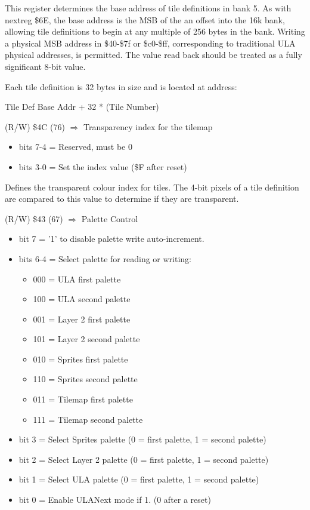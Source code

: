 This register determines the base address of tile definitions in bank
5.  As with nextreg \$6E, the base address is the MSB of the an offset
into the 16k bank, allowing tile definitions to begin at any multiple
of 256 bytes in the bank.  Writing a physical MSB address in \$40-\$7f
or \$c0-\$ff, corresponding to traditional ULA physical addresses, is
permitted.  The value read back should be treated as a fully
significant 8-bit value.

Each tile definition is 32 bytes in size and is located at address:

  Tile Def Base Addr + 32 * (Tile Number)

(R/W) \$4C (76) $\Rightarrow$ Transparency index for the tilemap
\begin{itemize}
\item bits 7-4 = Reserved, must be 0
\item bits 3-0 = Set the index value (\$F after reset)
\end{itemize}

Defines the transparent colour index for tiles.  The 4-bit pixels of a tile definition are compared to this value to determine if they are transparent.

(R/W) \$43 (67) $\Rightarrow$ Palette Control
\begin{itemize}
\item bit 7 = '1' to disable palette write auto-increment.
\item bits 6-4 = Select palette for reading or writing:
  \begin{itemize}
  \item 000 = ULA first palette
  \item 100 = ULA second palette
  \item 001 = Layer 2 first palette
  \item 101 = Layer 2 second palette
  \item 010 = Sprites first palette 
  \item 110 = Sprites second palette
  \item 011 = Tilemap first palette
  \item 111 = Tilemap second palette
  \end{itemize}
\item bit 3 = Select Sprites palette (0 = first palette, 1 = second palette)
\item bit 2 = Select Layer 2 palette (0 = first palette, 1 = second palette)
\item bit 1 = Select ULA palette (0 = first palette, 1 = second palette)
\item bit 0 = Enable ULANext mode if 1. (0 after a reset)
\end{itemize}

